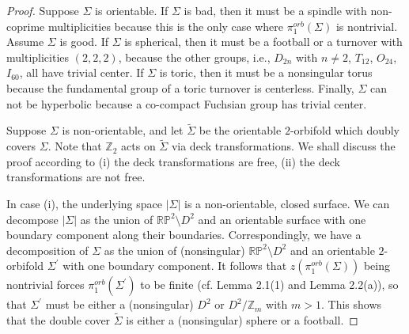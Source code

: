 \documentclass[11pt]{amsart}
\theoremstyle{plain}
\numberwithin{theorem}{section}
\theoremstyle{definition}
\begin{document}
\begin{proof}
Suppose $\Sigma$ is orientable. If $\Sigma$ is bad, then it must be a spindle with non-coprime 
multiplicities because this is the only case where $\pi_1^{orb}(\Sigma)$ is nontrivial. 
Assume $\Sigma$ is good. If $\Sigma$ is spherical, then it must be a football or a turnover with multiplicities $(2,2,2)$, because the other groups, i.e., $D_{2n}$ with $n\neq 2$, $T_{12}$, 
$O_{24}$, $I_{60}$, all have trivial center. If $\Sigma$ is toric, then it must be a nonsingular torus because the fundamental group of a toric turnover is centerless. Finally, $\Sigma$ can not be hyperbolic because a co-compact Fuchsian group has trivial center. 

Suppose $\Sigma$ is non-orientable, and let $\tilde{\Sigma}$ be the orientable $2$-orbifold which doubly covers $\Sigma$. Note that ${{\mathbb Z}}_2$ acts on $\tilde{\Sigma}$ via deck transformations. We shall discuss the proof according to (i) the deck transformations are free, (ii) the deck transformations are not free.

In case (i), the underlying space $|\Sigma|$ is a non-orientable, closed surface. We can decompose 
$|\Sigma|$ as the union of ${{\mathbb R}}{{\mathbb P}}^2\setminus D^2$ and an orientable surface with one boundary component along their boundaries. Correspondingly, we have a decomposition of $\Sigma$ as the union of (nonsingular) ${{\mathbb R}}{{\mathbb P}}^2\setminus D^2$ and an orientable $2$-orbifold $\Sigma^\prime$ with
one boundary component. It follows that $z(\pi_1^{orb}(\Sigma))$ being nontrivial forces $\pi_1^{orb}(\Sigma^\prime)$ to be finite (cf. Lemma 2.1(1) and Lemma 2.2(a)), so that $\Sigma^\prime$ must be either a (nonsingular) $D^2$ or $D^2/{{\mathbb Z}}_m$ with $m>1$. This shows that the double cover $\tilde{\Sigma}$ is either a (nonsingular) sphere or a football.


\end{proof}
\end{document}
